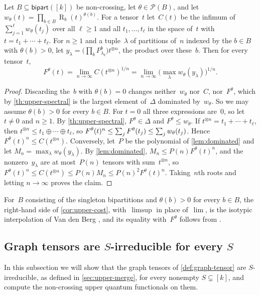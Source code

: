 \documentclass[11pt,letterpaper]{article}
\DeclareMathOperator{\tensorrank}{R}
\newcommand{\bipart}{\mathsf{bipart}}
\begin{document}
\begin{corollary}\label{cor:upper-cost}
Let $B \subseteq \bipart([k])$ be non-crossing, let $\theta \in \mathcal{P}(B)$, and let $w_\theta(t) = \prod_{b \in B} \tensorrank_b(t)^{\theta(b)}$. For a tensor~$t$ let~$C(t)$ be the infimum of $\sum_{j=1}^{\ell} w_\theta(t_j)$ over all $\ell \geq 1$ and all $t_1, \ldots, t_\ell$ in the space of~$t$ with $t = t_1 + \cdots + t_\ell$. For $n \geq 1$ and a tuple~$\lambda$ of partitions of~$n$ indexed by the $b \in B$ with $\theta(b) > 0$, let $y_\lambda = \bigl( \prod_b P^b_{\lambda_b} \bigr) t^{\otimes n}$, the product over these~$b$. Then for every tensor~$t$,
\[
F^\theta(t) = \lim_{n \to \infty} C(t^{\otimes n})^{1/n} = \lim_{n \to \infty} \bigl( \max_\lambda w_\theta(y_\lambda) \bigr)^{1/n}.
\]
\end{corollary}
\begin{proof}
Discarding the~$b$ with $\theta(b) = 0$ changes neither~$w_\theta$ nor~$C$, nor~$F^\theta$, which by \cref{th:upper-spectral} is the largest element of~$\Delta$ dominated by~$w_\theta$. So we may assume $\theta(b) > 0$ for every $b \in B$. For $t = 0$ all three expressions are~$0$, so let $t \neq 0$ and $n \geq 1$. By \cref{th:upper-spectral}, $F^\theta \in \Delta$ and $F^\theta \leq w_\theta$. If $t^{\otimes n} = t_1 + \cdots + t_\ell$, then $t^{\otimes n} \leq t_1 \oplus \cdots \oplus t_\ell$, so $F^\theta(t)^n \leq \sum_{\smash{j}} F^\theta(t_j) \leq \sum_{\smash{j}} w_\theta(t_j)$. Hence $F^\theta(t)^n \leq C(t^{\otimes n})$. Conversely, let~$P$ be the polynomial of \cref{lem:dominated} and let $M_n = \max_\lambda w_\theta(y_\lambda)$. By \cref{lem:dominated}, $M_n \leq P(n) F^\theta(t)^n$, and the nonzero~$y_\lambda$ are at most~$P(n)$ tensors with sum~$t^{\otimes n}$, so $F^\theta(t)^n \leq C(t^{\otimes n}) \leq P(n) M_n \leq P(n)^2 F^\theta(t)^n$. Taking~$n$th roots and letting $n \to \infty$ proves the claim.
\end{proof}

For~$B$ consisting of the singleton bipartitions and $\theta(b) > 0$ for every $b \in B$, the right-hand side of \cref{cor:upper-cost}, with~$\limsup$ in place of~$\lim$, is the isotypic interpolation of Van den Berg \cite[Definition~5.1]{vandenberg2023asymptotic}, and its equality with~$F^\theta$ follows from \cite[Theorems~4.36 and~5.4]{vandenberg2023asymptotic}.

\subsection{Graph tensors are \texorpdfstring{$S$}{S}-irreducible for every \texorpdfstring{$S$}{S}}\label{sec:upper-graph-tensors}
In this subsection we will show that the graph tensors of \cref{def:graph-tensor} are $S$-irreducible, as defined in \cref{sec:upper-merge}, for every nonempty $S \subsetneq [k]$, and compute the non-crossing upper quantum functionals on them. 
\end{document}
